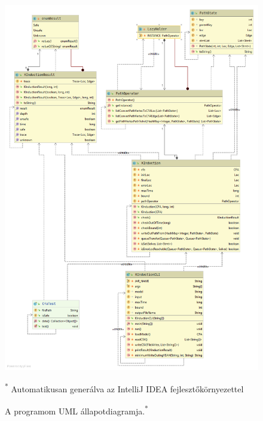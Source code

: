 \begin{figure}[!ht]
	\centering
	\includegraphics[width=150mm, keepaspectratio]{figures/allatpot_diag_png.png}
	\caption[Caption for LOF]{A programom UML állapotdiagramja.\textsuperscript{*}}
	\small\textsuperscript{*} Automatikusan generálva az IntelliJ IDEA fejlesztőkörnyezettel
	\label{fig:state_diagram}
\end{figure}
\clearpage

